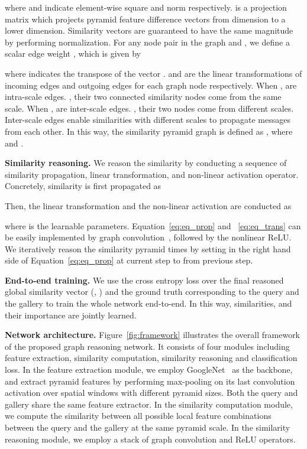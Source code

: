 \documentclass[10pt,twocolumn,letterpaper]{article}
\begin{document}
where  and  indicate element-wise square and  norm respectively.  is a projection matrix which projects pyramid feature difference vectors from  dimension to a lower  dimension. Similarity vectors are guaranteed to have the same magnitude by performing normalization. For any node pair in the graph  and , we define a scalar edge weight , which is given by

where  indicates the transpose of the vector .  and  are the linear transformations of incoming edges and outgoing edges for each graph node respectively. When ,  are intra-scale  edges. \ie, their two connected similarity nodes come from the same scale. When ,  are inter-scale  edges. \ie, their two nodes come from different scales. Inter-scale edges enable similarities with different scales to propagate messages from each other. In this way, the similarity pyramid graph is defined as , where  and .


\textbf{Similarity reasoning.} We reason the similarity   by conducting  a sequence of similarity propagation, linear transformation, and non-linear activation operator. Concretely, similarity is first propagated as

Then, the linear transformation and the non-linear activation are conducted as

where  is the learnable parameters. Equation~\ref{eq:eq_prop} and ~\ref{eq:eq_trans} can be easily implemented by graph convolution~\cite{Kipf2017}, followed by the nonlinear ReLU. We iteratively reason the similarity pyramid  times by setting  in the right hand side of Equation~\ref{eq:eq_prop} at current step to  from previous step.

\textbf{End-to-end training.} {We use the cross entropy loss over the final reasoned global similarity vector (\ie, )  and the ground truth  corresponding to the query and the gallery  to train the whole network end-to-end. In this way, similarities, and their importance are jointly learned.}



\textbf{Network architecture.} Figure~\ref{fig:framework} illustrates the overall framework of the proposed graph reasoning network. It consists of four modules including feature extraction, similarity computation, similarity reasoning and classification loss. In the feature extraction module, we employ GoogleNet~\cite{Szegedy2014} as the backbone, and extract pyramid features by performing max-pooling on its last convolution activation over spatial windows with different pyramid sizes. Both the query and gallery share the same feature extractor.
In the similarity computation module, we compute the similarity between all possible local feature combinations between the query and the gallery at the same pyramid scale. In the similarity reasoning module, we employ a stack of graph convolution and ReLU operators.
\end{document}
